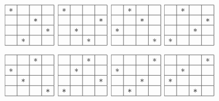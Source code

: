 \begin{center}
$\begin{array}{ |c|c|c|c| }
\hline
 *  &  &  & \\ 
\hline
 &  &  *  & \\ 
\hline
 &  &  &  * \\
\hline
 &  *  &  & \\
\hline
\end{array}$
{}
$\begin{array}{ |c|c|c|c| }
\hline
 *  &  &  & \\ 
\hline
 &  &  &  * \\ 
\hline
 &  *  &  & \\
\hline
 &  &  *  & \\
\hline
\end{array}$
{}
$\begin{array}{ |c|c|c|c| }
\hline
 &  *  &  & \\ 
\hline
 &  &  *  & \\ 
\hline
 *  &  &  & \\
\hline
 &  &  &  * \\
\hline
\end{array}$
{}
$\begin{array}{ |c|c|c|c| }
\hline
 &  *  &  & \\ 
\hline
 &  &  &  * \\ 
\hline
 &  &  *  & \\
\hline
 *  &  &  & \\
\hline
\end{array}$
\end{center}
\begin{center}
$\begin{array}{ |c|c|c|c| }
\hline
 &  &  *  & \\ 
\hline
 *  &  &  & \\ 
\hline
 &  *  &  & \\
\hline
 &  &  &  * \\
\hline
\end{array}$
{}
$\begin{array}{ |c|c|c|c| }
\hline
 &  &  *  & \\ 
\hline
 &  *  &  & \\ 
\hline
 &  &  &  * \\
\hline
 *  &  &  & \\
\hline
\end{array}$
{}
$\begin{array}{ |c|c|c|c| }
\hline
 &  &  &  * \\ 
\hline
 *  &  &  & \\ 
\hline
 &  &  *  & \\
\hline
 &  *  &  & \\
\hline
\end{array}$
{}
$\begin{array}{ |c|c|c|c| }
\hline
 &  &  &  * \\ 
\hline
 &  *  &  & \\ 
\hline
 *  &  &  & \\
\hline
 &  &  *  & \\
\hline
\end{array}$
\end{center}

